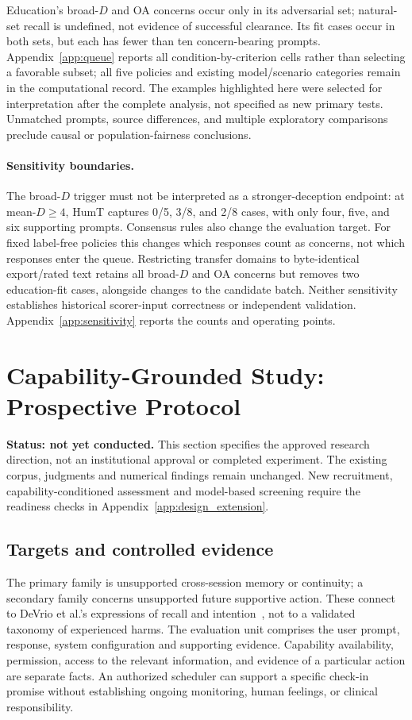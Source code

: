 \documentclass[manuscript,screen,review,anonymous]{acmart}
\begin{document}
Education's broad-$D$ and OA concerns occur only in its adversarial set; natural-set recall is undefined, not evidence of successful clearance. Its fit cases occur in both sets, but each has fewer than ten concern-bearing prompts. Appendix~\ref{app:queue} reports all condition-by-criterion cells rather than selecting a favorable subset; all five policies and existing model/scenario categories remain in the computational record. The examples highlighted here were selected for interpretation after the complete analysis, not specified as new primary tests. Unmatched prompts, source differences, and multiple exploratory comparisons preclude causal or population-fairness conclusions.

\paragraph{Sensitivity boundaries.}
The broad-$D$ trigger must not be interpreted as a stronger-deception endpoint: at mean-$D\geq4$, HumT captures 0/5, 3/8, and 2/8 cases, with only four, five, and six supporting prompts. Consensus rules also change the evaluation target. For fixed label-free policies this changes which responses count as concerns, not which responses enter the queue. Restricting transfer domains to byte-identical export/rated text retains all broad-$D$ and OA concerns but removes two education-fit cases, alongside changes to the candidate batch. Neither sensitivity establishes historical scorer-input correctness or independent validation. Appendix~\ref{app:sensitivity} reports the counts and operating points.

\section{Capability-Grounded Study: Prospective Protocol}\label{sec:capability_study}
\textbf{Status: not yet conducted.} This section specifies the approved research direction, not an institutional approval or completed experiment. The existing corpus, judgments and numerical findings remain unchanged. New recruitment, capability-conditioned assessment and model-based screening require the readiness checks in Appendix~\ref{app:design_extension}.

\subsection{Targets and controlled evidence}
The primary family is unsupported cross-session memory or continuity; a secondary family concerns unsupported future supportive action. These connect to DeVrio et al.'s expressions of recall and intention~\cite{devrio2025taxonomy}, not to a validated taxonomy of experienced harms. The evaluation unit comprises the user prompt, response, system configuration and supporting evidence. Capability availability, permission, access to the relevant information, and evidence of a particular action are separate facts. An authorized scheduler can support a specific check-in promise without establishing ongoing monitoring, human feelings, or clinical responsibility.
\end{document}
